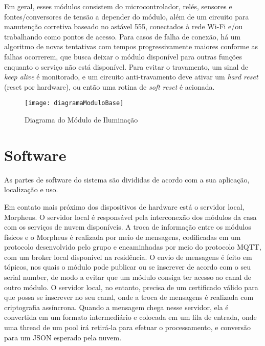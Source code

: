 Em geral, esses módulos consistem do microcontrolador, relés, sensores e fontes/conversores de tensão a depender do módulo, além de um circuito para manutenção corretiva baseado no astável 555, conectados à rede Wi-Fi e/ou trabalhando como pontos de acesso. Para casos de falha de conexão, há um algoritmo de novas tentativas com tempos progressivamente maiores conforme as falhas ocorrerem, que busca deixar o módulo disponível para outras funções enquanto o serviço não está disponível. Para evitar o travamento, um sinal de \textit{keep alive} é monitorado, e um circuito anti-travamento deve ativar um \textit{hard reset} (reset por hardware), ou então uma rotina de \textit{soft reset} é acionada.

\begin{figure}[H]
	\caption{\label{fig:diagramaModuloBase}Diagrama do Módulo de Iluminação}
	\begin{center}
		\texttt{[image: diagramaModuloBase]}
	\end{center}
\end{figure}


\section{Software}

As partes de software do sistema são divididas de acordo com a sua aplicação, localização e uso.

Em contato mais próximo dos dispositivos de hardware está o servidor local, Morpheus. O servidor local é responsável pela interconexão dos módulos da casa com os serviços de nuvem disponíveis. A troca de informação entre os módulos físicos e o Morpheus é realizada por meio de mensagens, codificadas em um protocolo desenvolvido pelo grupo e encaminhadas por meio do protocolo MQTT, com um broker local disponível na residência. O envio de mensagens é feito em tópicos, nos quais o módulo pode publicar ou se inscrever de acordo com o seu serial number, de modo a evitar que um módulo consiga ter acesso ao canal de outro módulo. O servidor local, no entanto, precisa de um certificado válido para que possa se inscrever no seu canal, onde a troca de mensagens é realizada com criptografia assíncrona. Quando a mensagem chega nesse servidor, ela é convertida em um formato intermediário e colocada em um fila de entrada, onde uma thread de um pool irá retirá-la para efetuar o processamento, e conversão para um JSON esperado pela nuvem.

